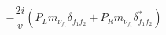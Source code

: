%
\begin{dmath*}
%
  -  \frac{2 i}{v} \left(P_L m_{\nu_{f_1}} \delta_{f_1 f_2} + P_R m_{\nu_{f_1}} \delta_{f_1 f_2}^*\right)
%
\end{dmath*}
%
